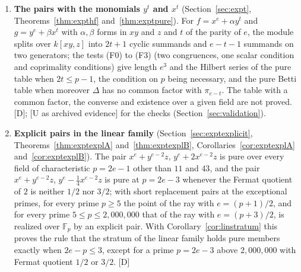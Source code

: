 \documentclass[11pt]{article}
\theoremstyle{definition}
\theoremstyle{remark}
\newcommand{\F}{\mathbb{F}}
\begin{document}
\begin{enumerate}
\item \textbf{The pairs with the monomials $y^t$ and $x^t$} (Section~\ref{sec:expt}, Theorems~\ref{thm:expthf} and~\ref{thm:exptpure}). For $f=x^e+\alpha y^t$ and $g=y^e+\beta x^t$ with $\alpha,\beta$ forms in $xy$ and $z$ and $t$ of the parity of $e$, the module splits over $k[xy,z]$ into $2t+1$ cyclic summands and $e-t-1$ summands on two generators; the tests (F0) to (F3) (two congruences, one scalar condition and coprimality conditions) give length $e^3$ and the Hilbert series of the pure table when $2t\le p-1$, the condition on $p$ being necessary, and the pure Betti table when moreover $\Delta$ has no common factor with $\pi_{e-t}$. The table with a common factor, the converse and existence over a given field are not proved. [D]; [U as archived evidence] for the checks (Section~\ref{sec:validation}).
\item \textbf{Explicit pairs in the linear family} (Section~\ref{sec:exptexplicit}, Theorems~\ref{thm:exptexplA} and~\ref{thm:exptexplB}, Corollaries~\ref{cor:exptexplA} and~\ref{cor:exptexplB}). The pair $x^e+y^{e-2}z$, $y^e+2x^{e-2}z$ is pure over every field of characteristic $p=2e-1$ other than $11$ and $43$, and the pair $x^e+y^{e-2}z$, $y^e-\tfrac14x^{e-2}z$ is pure at $p=2e-3$ whenever the Fermat quotient of $2$ is neither $1/2$ nor $3/2$; with short replacement pairs at the exceptional primes, for every prime $p\ge5$ the point of the ray with $e=(p+1)/2$, and for every prime $5\le p\le2{,}000{,}000$ that of the ray with $e=(p+3)/2$, is realized over $\F_p$ by an explicit pair. With Corollary~\ref{cor:linstratum} this proves the rule that the stratum of the linear family holds pure members exactly when $2e-p\le3$, except for a prime $p=2e-3$ above $2{,}000{,}000$ with Fermat quotient $1/2$ or $3/2$. [D]


\end{enumerate}
\end{document}
